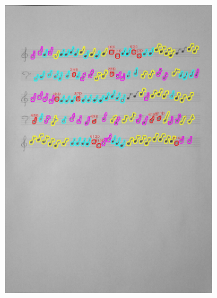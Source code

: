 \documentclass[11pt]{article}
\begin{document}
\begin{figure}[H]
\begin{subfigure}{.5\textwidth}
        \includegraphics[width=\linewidth]{22_cnts.jpg}
        \label{fig:sub2}
    \end{subfigure}
    \label{fig:test}
\end{figure}
\end{document}
